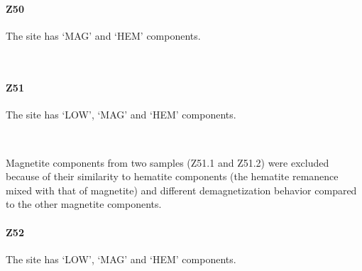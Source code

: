 \documentclass[11pt]{article}
\begin{document}
    \begin{center}
    \end{center}
    { \hspace*{\fill} \\}
    
    \paragraph{Z50}\label{z50}

    The site has `MAG' and `HEM' components.



    \begin{center}
    \end{center}
    { \hspace*{\fill} \\}
    
    \paragraph{Z51}\label{z51}

    The site has `LOW', `MAG' and `HEM' components.



    \begin{center}
    \end{center}
    { \hspace*{\fill} \\}
    
    Magnetite components from two samples (Z51.1 and Z51.2) were excluded
because of their similarity to hematite components (the hematite
remanence mixed with that of magnetite) and different demagnetization
behavior compared to the other magnetite components.

    \paragraph{Z52}\label{z52}

    The site has `LOW', `MAG' and `HEM' components.



    \begin{center}
    \end{center}
    { \hspace*{\fill} \\}
    
\end{document}
